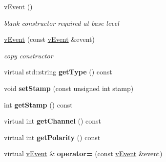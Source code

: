 \begin{DoxyCompactItemize}
\item 
\hyperlink{classev_1_1vEvent_a397825b956ef6d60cbedaa27414117bc}{v\+Event} ()\hypertarget{classev_1_1vEvent_a397825b956ef6d60cbedaa27414117bc}{}\label{classev_1_1vEvent_a397825b956ef6d60cbedaa27414117bc}

\begin{DoxyCompactList}\small\item\em blank constructor required at base level \end{DoxyCompactList}\item 
\hyperlink{classev_1_1vEvent_aaba2a98a5821fbad33523f558e9c565a}{v\+Event} (const \hyperlink{classev_1_1vEvent}{v\+Event} \&event)\hypertarget{classev_1_1vEvent_aaba2a98a5821fbad33523f558e9c565a}{}\label{classev_1_1vEvent_aaba2a98a5821fbad33523f558e9c565a}

\begin{DoxyCompactList}\small\item\em copy constructor \end{DoxyCompactList}\item 
virtual std\+::string {\bfseries get\+Type} () const \hypertarget{classev_1_1vEvent_a78ae84b6bc48e188a48803c0a63c7eec}{}\label{classev_1_1vEvent_a78ae84b6bc48e188a48803c0a63c7eec}

\item 
void {\bfseries set\+Stamp} (const unsigned int stamp)\hypertarget{classev_1_1vEvent_a23a27198e491e78b2dd90261d272c3a3}{}\label{classev_1_1vEvent_a23a27198e491e78b2dd90261d272c3a3}

\item 
int {\bfseries get\+Stamp} () const \hypertarget{classev_1_1vEvent_a8f24ece8c78e3b657228359643c9afbf}{}\label{classev_1_1vEvent_a8f24ece8c78e3b657228359643c9afbf}

\item 
virtual int {\bfseries get\+Channel} () const \hypertarget{classev_1_1vEvent_a195be4c62f8464a3bb8101d74ca3aabd}{}\label{classev_1_1vEvent_a195be4c62f8464a3bb8101d74ca3aabd}

\item 
virtual int {\bfseries get\+Polarity} () const \hypertarget{classev_1_1vEvent_a36d189c20a3fab42021de214a64ff5ee}{}\label{classev_1_1vEvent_a36d189c20a3fab42021de214a64ff5ee}

\item 
virtual \hyperlink{classev_1_1vEvent}{v\+Event} \& {\bfseries operator=} (const \hyperlink{classev_1_1vEvent}{v\+Event} \&event)\hypertarget{classev_1_1vEvent_a26f0b1283811c19e46ad859c00c651ce}{}\label{classev_1_1vEvent_a26f0b1283811c19e46ad859c00c651ce}


\end{DoxyCompactItemize}
